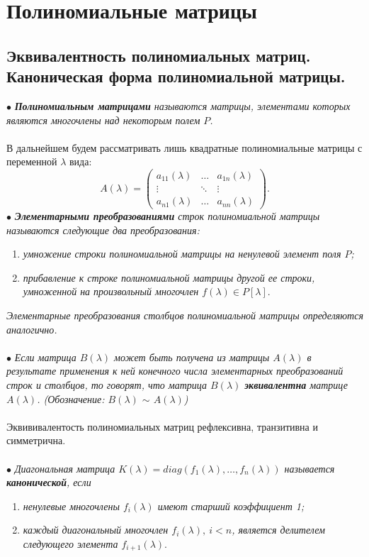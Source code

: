 \chapter{Полиномиальные матрицы}

\section{Эквивалентность полиномиальных матриц. Каноническая форма полиномиальной матрицы.}
$\bullet$ \textit{\textbf{Полиномиальным матрицами} называются матрицы, элементами которых являются многочлены над некоторым полем $P$.}\\\\
В дальнейшем будем рассматривать лишь квадратные полиномиальные матрицы с переменной $\lambda$ вида: $$A(\lambda) = \begin{pmatrix} a_{11}(\lambda)& \dots & a_{1n}(\lambda) \\ \vdots & \ddots & \vdots \\ a_{n1}(\lambda) & \dots & a_{nn}(\lambda) \end{pmatrix}.$$
$\bullet$ \textit{\textbf{Элементарными преобразованиями} строк полиномиальной матрицы называются следующие два преобразования:}
\begin{enumerate}
	\item \textit{умножение строки полиномиальной матрицы на ненулевой элемент поля $P$;}
	\item \textit{прибавление к строке полиномиальной матрицы другой ее строки, умноженной на произвольный многочлен $f(\lambda)\in P[\lambda]$}.
\end{enumerate}
\textit{Элементарные преобразования столбцов полиномиальной матрицы определяются аналогично.}\\\\
$\bullet$ \textit{Если матрица $B(\lambda)$ может быть получена из матрицы $A(\lambda)$ в результате применения к ней конечного числа элементарных преобразований строк и столбцов, то говорят, что матрица $B(\lambda)$ \textbf{эквивалентна} матрице $A(\lambda)$. (Обозначение: $B(\lambda)$ $\sim$ $A(\lambda)$)}\\\\
Эквививалентость полиномиальных матриц рефлексивна, транзитивна и симметрична.\\\\
$\bullet$ \textit{Диагональная матрица $K(\lambda) = diag(f_1(\lambda),\dots,f_n(\lambda))$ называется \textbf{канонической}, если}
\begin{enumerate}
	\item \textit{ненулевые многочлены $f_i(\lambda)$ имеют старший коэффициент 1;}
	\item \textit{каждый диагональный многочлен $f_i(\lambda),\ i<n$, является делителем следующего элемента $f_{i+1}(\lambda)$}.
\end{enumerate}
